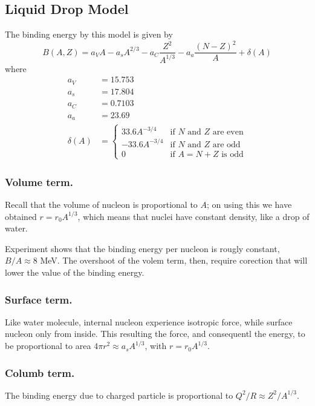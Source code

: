 \documentclass[../../../main.tex]{subfiles}
\begin{document}
\subsection*{Liquid Drop Model}
The binding energy by this model is given by 
\begin{equation*}
    B(A,Z)=a_VA- a_sA^{2/3}- a_C\frac{Z^2}{A^{1/3}}-a_a\frac{(N-Z)^2}{A} +\delta(A)
\end{equation*}
where
\begin{align*}
    a_V&= 15.753 \\
    a_s&= 17.804 \\
    a_C&= 0.7103 \\
    a_a&= 23.69 \\
    \delta(A)&= \begin{cases}
        33.6 A^{-3/4}& \text{if $N$ and $Z$ are even}\\
        -33.6 A^{-3/4}& \text{if $N$ and $Z$ are odd}\\
        0 & \text{if $A=N+Z$ is odd}
    \end{cases}
\end{align*}

\subsubsection*{Volume term.} Recall that the volume of nucleon is proportional to $A$; on using this we have obtained $r=r_0A^{1/3}$, which means that nuclei have constant density, like a drop of water. 

Experiment shows that the binding energy per nucleon is rougly constant, $B/A\approx 8$ MeV. The overshoot of the volem term, then, require corection that will lower the value of the binding energy.

\subsubsection*{Surface term.} Like water molecule, internal nucleon experience isotropic force, while surface nucleon only from inside. This resulting the force, and consequentl the energy, to be proportional to area $4\pi r^2\approx a_sA^{1/3}$, with $r=r_0A^{1/3}$.

\subsubsection*{Columb term.} The binding energy due to charged particle is proportional to $Q^2/R\approx Z^2/A^{1/3}$.
\end{document}

